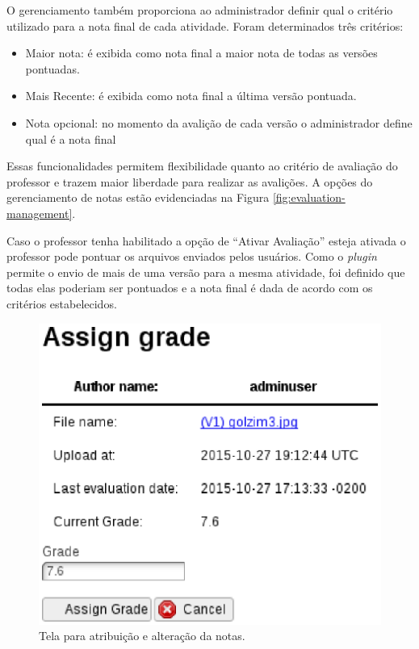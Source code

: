 O gerenciamento também proporciona ao administrador definir qual o critério utilizado para a nota final de cada atividade. Foram determinados três critérios:
\begin{itemize}
\item Maior nota: é exibida como nota final a maior nota de todas as versões pontuadas.
\item Mais Recente: é exibida como nota final a última versão pontuada.
\item Nota opcional: no momento da avalição de cada versão o administrador define qual é a nota final
\end{itemize}

Essas funcionalidades permitem flexibilidade quanto ao critério de avaliação do professor e trazem maior liberdade para realizar as avalições. A opções do gerenciamento de notas estão evidenciadas na Figura \ref{fig:evaluation-management}.

Caso o professor tenha habilitado a opção de ``Ativar Avaliação'' esteja ativada o professor pode pontuar os arquivos enviados pelos usuários. Como o \textit{plugin} permite o envio de mais de uma versão para a mesma atividade, foi definido que todas elas poderiam ser pontuados e a nota final é dada de acordo com os critérios estabelecidos.

\begin{figure}[h]
    \centering
    \includegraphics[keepaspectratio=true,scale=0.6]
      {figuras/assign-grade.eps}
    \caption{Tela para atribuição e alteração da notas.}
    \label{fig:assign-grade}
\end{figure}

